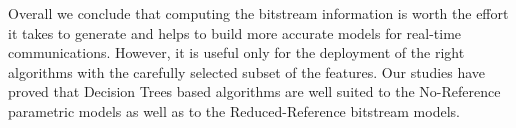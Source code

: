 \documentclass[journal]{IEEEtran}
\begin{document}
Overall we conclude that computing the bitstream information is worth the effort it takes to generate and helps to build more accurate models for real-time communications. However, it is useful only for the deployment of the right algorithms with the carefully selected subset of the features. Our studies have proved that Decision Trees based algorithms are well suited to the No-Reference parametric models as well as to the Reduced-Reference bitstream models.


%
%



%
%
\end{document}

